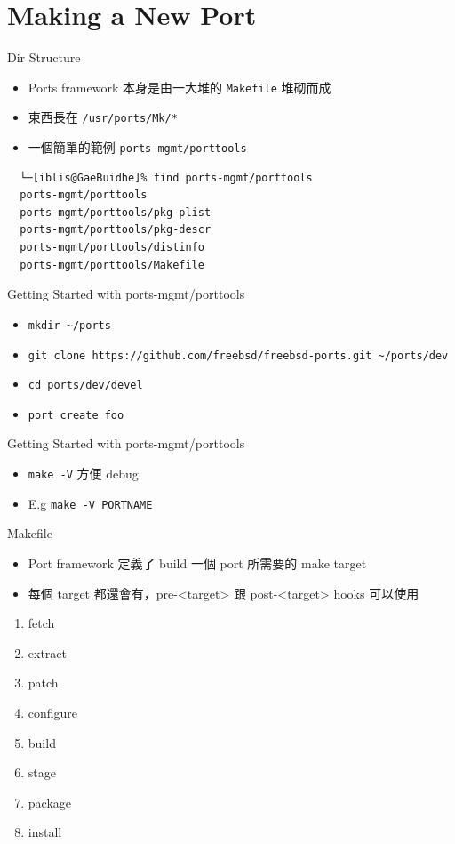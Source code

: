 \documentclass[aspectratio=169]{beamer}
\begin{document}
\section{Making a New Port}
\begin{frame}[t,fragile]{Dir Structure}
  \begin{itemize}
    \item Ports framework 本身是由一大堆的 \verb|Makefile| 堆砌而成
    \item 東西長在 \verb|/usr/ports/Mk/*|
    \item 一個簡單的範例 \verb|ports-mgmt/porttools|
  \end{itemize}

  \begin{verbatim}
  └─[iblis@GaeBuidhe]% find ports-mgmt/porttools
  ports-mgmt/porttools
  ports-mgmt/porttools/pkg-plist
  ports-mgmt/porttools/pkg-descr
  ports-mgmt/porttools/distinfo
  ports-mgmt/porttools/Makefile
  \end{verbatim}
\end{frame}

\begin{frame}[t,fragile]{Getting Started with ports-mgmt/porttools}
  \begin{itemize}
    \item \verb`mkdir ~/ports`
    \item \verb`git clone https://github.com/freebsd/freebsd-ports.git ~/ports/dev`
    \item \verb`cd ports/dev/devel`
    \item \verb`port create foo`
  \end{itemize}
\end{frame}

\begin{frame}[t,fragile]{Getting Started with ports-mgmt/porttools}
  \begin{itemize}
    \item \verb|make -V| 方便 debug
    \item E.g \verb|make -V PORTNAME|
  \end{itemize}
\end{frame}

\begin{frame}[t]{Makefile}
  \begin{itemize}
    \item Port framework 定義了 build 一個 port 所需要的 make target
    \item 每個 target 都還會有，pre-<target> 跟 post-<target> hooks 可以使用
  \end{itemize}
  \begin{enumerate}
    \item fetch
    \item extract
    \item patch
    \item configure
    \item build
    \item stage
    \item package
    \item install
  \end{enumerate}
\end{frame}
\end{document}
